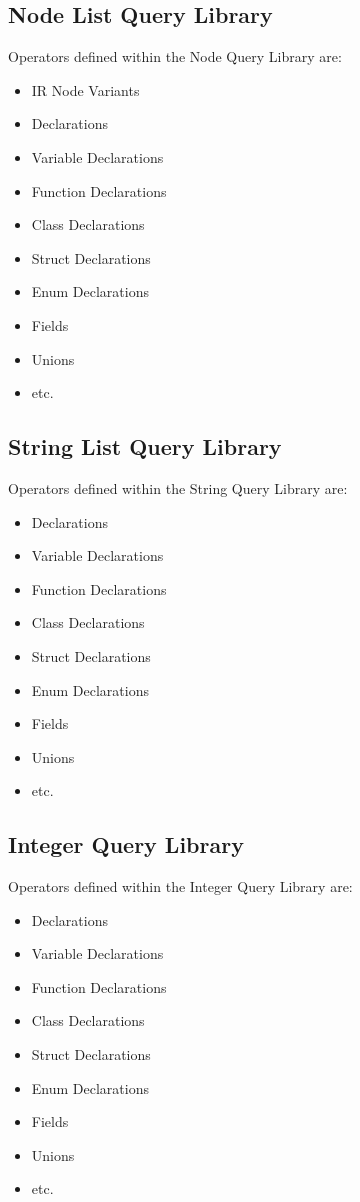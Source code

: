 {\subsection{Node List Query Library}
     Operators defined within the Node Query Library are:
\begin{itemize}
     \item IR Node Variants
     \item Declarations
     \item Variable Declarations
     \item Function Declarations
     \item Class Declarations
     \item Struct Declarations
     \item Enum Declarations
     \item Fields
     \item Unions
     \item etc.
\end{itemize}

\subsection{String List Query Library}
     Operators defined within the String Query Library are:
\begin{itemize}
     \item Declarations
     \item Variable Declarations
     \item Function Declarations
     \item Class Declarations
     \item Struct Declarations
     \item Enum Declarations
     \item Fields
     \item Unions
     \item etc.
\end{itemize}


\subsection{Integer Query Library}
     Operators defined within the Integer Query Library are:
\begin{itemize}
     \item Declarations
     \item Variable Declarations
     \item Function Declarations
     \item Class Declarations
     \item Struct Declarations
     \item Enum Declarations
     \item Fields
     \item Unions
     \item etc.
\end{itemize}


}
